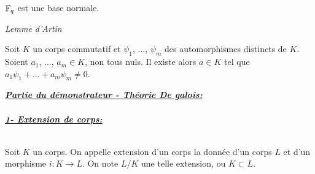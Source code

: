 \documentclass[12pt,a4paper]{article}
\begin{document}
\begin{flushleft}
\begin{thm}
$\mathbb{F}_q$ est une base normale.
\end{thm}

\textit{Lemme d'Artin}
\begin{thm}
Soit $K$ un corps commutatif et $\psi_1$, $\ldots$, $\psi_m$ des automorphismes distincts de $K$. Soient $a_1$, $\ldots$, $a_m \in K$, non tous nuls. Il existe alors $a \in K$ tel que $a_1 \psi_1 + \ldots + a_m \psi_m \neq 0$.
\end{thm}


\textbf{\textit{\underline{Partie du démonstrateur - Théorie De galois: }}}\\~\\

\textbf{\textit{\underline{1- Extension de corps: }}}\\~\\

\begin{mydef}
Soit $K$ un corps. On appelle extension d'un corps la donnée d'un corps $L$ et d'un morphisme $i : K \longrightarrow L$. On note $L/K$ une telle extension, ou $K \subset L$.
\end{mydef}







\end{flushleft}


 
\end{document}
